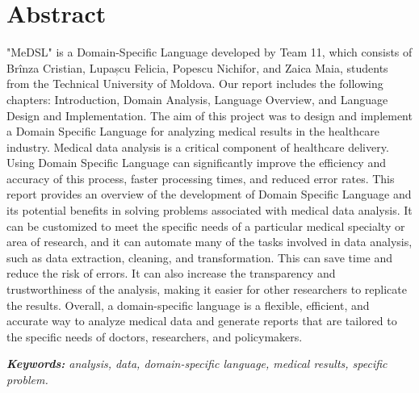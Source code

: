 \chapter*{Abstract}

"MeDSL" is a Domain-Specific Language developed by Team 11, which consists of Brînza Cristian, Lupașcu Felicia, Popescu Nichifor, and Zaica Maia, students from the Technical University of Moldova.
Our report includes the following chapters: Introduction, Domain Analysis, Language Overview, and Language Design and Implementation.
The aim of this project was to design and implement a Domain Specific Language for analyzing medical results in the healthcare industry. Medical data analysis is a critical component of healthcare delivery. Using Domain Specific Language can significantly improve the efficiency and accuracy of this process,  faster processing times, and reduced error rates. This report provides an overview of the development of Domain Specific Language and its potential benefits in solving problems associated with medical data analysis.
It can be customized to meet the specific needs of a particular medical specialty or area of research, and it can automate many of the tasks involved in data analysis, such as data extraction, cleaning, and transformation. This can save time and reduce the risk of errors. It can also increase the transparency and trustworthiness of the analysis, making it easier for other researchers to replicate the results. Overall, a domain-specific language is a flexible, efficient, and accurate way to analyze medical data and generate reports that are tailored to the specific needs of doctors, researchers, and policymakers.

\vspace{0.5cm}

\emph{\textbf{Keywords: } analysis, data, domain-specific language, medical results, specific problem.}

